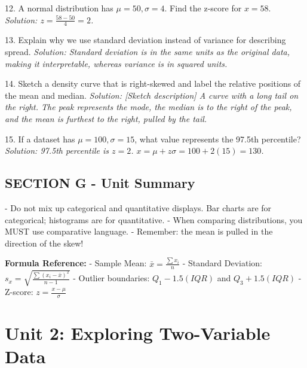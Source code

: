 \begin{workbookbox}
12. A normal distribution has $\mu=50, \sigma=4$. Find the z-score for $x=58$.
\textit{Solution: $z = \frac{58-50}{4} = 2$.}

13. Explain why we use standard deviation instead of variance for describing spread.
\textit{Solution: Standard deviation is in the same units as the original data, making it interpretable, whereas variance is in squared units.}

14. Sketch a density curve that is right-skewed and label the relative positions of the mean and median.
\textit{Solution: [Sketch description] A curve with a long tail on the right. The peak represents the mode, the median is to the right of the peak, and the mean is furthest to the right, pulled by the tail.}

15. If a dataset has $\mu=100, \sigma=15$, what value represents the 97.5th percentile?
\textit{Solution: 97.5th percentile is $z=2$. $x = \mu + z\sigma = 100 + 2(15) = 130$.}
\end{workbookbox}

\section{SECTION G - Unit Summary}
\begin{trapbox}
- Do not mix up categorical and quantitative displays. Bar charts are for categorical; histograms are for quantitative.
- When comparing distributions, you MUST use comparative language.
- Remember: the mean is pulled in the direction of the skew!
\end{trapbox}

\textbf{Formula Reference:}
- Sample Mean: $\bar{x} = \frac{\sum x_i}{n}$
- Standard Deviation: $s_x = \sqrt{\frac{\sum (x_i - \bar{x})^2}{n-1}}$
- Outlier boundaries: $Q_1 - 1.5(IQR)$ and $Q_3 + 1.5(IQR)$
- Z-score: $z = \frac{x - \mu}{\sigma}$
\chapter{Unit 2: Exploring Two-Variable Data}


